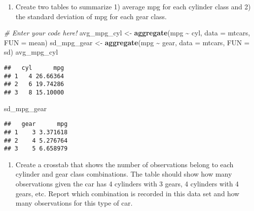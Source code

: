 \documentclass[
]{article}
\newenvironment{Shaded}{\begin{snugshade}}{\end{snugshade}}
\newcommand{\AttributeTok}[1]{\textcolor[rgb]{0.13,0.29,0.53}{#1}}
\newcommand{\CommentTok}[1]{\textcolor[rgb]{0.56,0.35,0.01}{\textit{#1}}}
\newcommand{\FunctionTok}[1]{\textcolor[rgb]{0.13,0.29,0.53}{\textbf{#1}}}
\newcommand{\NormalTok}[1]{#1}
\newcommand{\OtherTok}[1]{\textcolor[rgb]{0.56,0.35,0.01}{#1}}
\newcommand{\SpecialCharTok}[1]{\textcolor[rgb]{0.81,0.36,0.00}{\textbf{#1}}}
\providecommand{\tightlist}{%
  \setlength{\itemsep}{0pt}\setlength{\parskip}{0pt}}
\begin{document}
\begin{enumerate}
\def\labelenumi{\alph{enumi}.}
\setcounter{enumi}{3}
\tightlist
\item
  Create two tables to summarize 1) average mpg for each cylinder class
  and 2) the standard deviation of mpg for each gear class.
\end{enumerate}

\begin{Shaded}
\begin{Highlighting}[]
\CommentTok{\# Enter your code here!}
\NormalTok{avg\_mpg\_cyl }\OtherTok{\textless{}{-}} \FunctionTok{aggregate}\NormalTok{(mpg }\SpecialCharTok{\textasciitilde{}}\NormalTok{ cyl, }\AttributeTok{data =}\NormalTok{ mtcars, }\AttributeTok{FUN =}\NormalTok{ mean)}
\NormalTok{sd\_mpg\_gear }\OtherTok{\textless{}{-}} \FunctionTok{aggregate}\NormalTok{(mpg }\SpecialCharTok{\textasciitilde{}}\NormalTok{ gear, }\AttributeTok{data =}\NormalTok{ mtcars, }\AttributeTok{FUN =}\NormalTok{ sd)}
\NormalTok{avg\_mpg\_cyl}
\end{Highlighting}
\end{Shaded}

\begin{verbatim}
##   cyl      mpg
## 1   4 26.66364
## 2   6 19.74286
## 3   8 15.10000
\end{verbatim}

\begin{Shaded}
\begin{Highlighting}[]
\NormalTok{sd\_mpg\_gear}
\end{Highlighting}
\end{Shaded}

\begin{verbatim}
##   gear      mpg
## 1    3 3.371618
## 2    4 5.276764
## 3    5 6.658979
\end{verbatim}

\begin{enumerate}
\def\labelenumi{\alph{enumi}.}
\setcounter{enumi}{4}
\tightlist
\item
  Create a crosstab that shows the number of observations belong to each
  cylinder and gear class combinations. The table should show how many
  observations given the car has 4 cylinders with 3 gears, 4 cylinders
  with 4 gears, etc. Report which combination is recorded in this data
  set and how many observations for this type of car.
\end{enumerate}

\begin{Shaded}
\end{Shaded}
\end{document}
